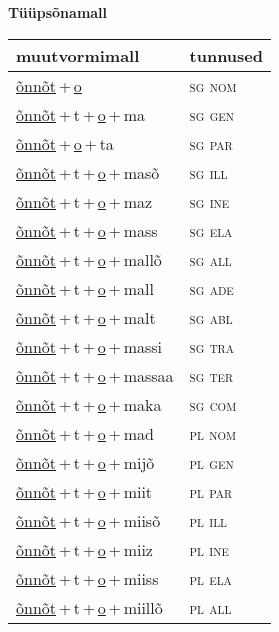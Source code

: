 
\vspace{1.8em}
\begin{minipage}{\textwidth}
\textbf{Tüüpsõnamall \,}\\

\begin{sideways}
\begin{tabular}{l l}
muutvormimall & tunnused \\
\hline
\underline{õnnõt}\,+\,\underline{o} & \textsc{ sg nom } \\
\underline{õnnõt}\,+\,t\,+\,\underline{o}\,+\,ma & \textsc{ sg gen } \\
\underline{õnnõt}\,+\,\underline{o}\,+\,ta & \textsc{ sg par } \\
\underline{õnnõt}\,+\,t\,+\,\underline{o}\,+\,masõ & \textsc{ sg ill } \\
\underline{õnnõt}\,+\,t\,+\,\underline{o}\,+\,maz & \textsc{ sg ine } \\
\underline{õnnõt}\,+\,t\,+\,\underline{o}\,+\,mass & \textsc{ sg ela } \\
\underline{õnnõt}\,+\,t\,+\,\underline{o}\,+\,mallõ & \textsc{ sg all } \\
\underline{õnnõt}\,+\,t\,+\,\underline{o}\,+\,mall & \textsc{ sg ade } \\
\underline{õnnõt}\,+\,t\,+\,\underline{o}\,+\,malt & \textsc{ sg abl } \\
\underline{õnnõt}\,+\,t\,+\,\underline{o}\,+\,massi & \textsc{ sg tra } \\
\underline{õnnõt}\,+\,t\,+\,\underline{o}\,+\,massaa & \textsc{ sg ter } \\
\underline{õnnõt}\,+\,t\,+\,\underline{o}\,+\,maka & \textsc{ sg com } \\
\underline{õnnõt}\,+\,t\,+\,\underline{o}\,+\,mad & \textsc{ pl nom } \\
\underline{õnnõt}\,+\,t\,+\,\underline{o}\,+\,mijõ & \textsc{ pl gen } \\
\underline{õnnõt}\,+\,t\,+\,\underline{o}\,+\,miit & \textsc{ pl par } \\
\underline{õnnõt}\,+\,t\,+\,\underline{o}\,+\,miisõ & \textsc{ pl ill } \\
\underline{õnnõt}\,+\,t\,+\,\underline{o}\,+\,miiz & \textsc{ pl ine } \\
\underline{õnnõt}\,+\,t\,+\,\underline{o}\,+\,miiss & \textsc{ pl ela } \\
\underline{õnnõt}\,+\,t\,+\,\underline{o}\,+\,miillõ & \textsc{ pl all } \\

\end{tabular}
\end{sideways}
\end{minipage}
